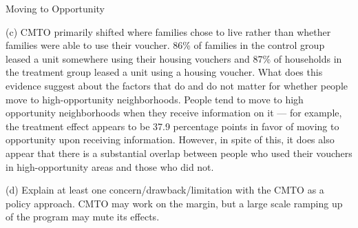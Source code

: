 \documentclass[10pt]{extarticle}
\begin{document}
\begin{problem}{Moving to Opportunity}
\begin{problem}{(c)}
      CMTO primarily shifted where families chose to live rather than whether families were able to use their voucher. 86\% of families in the control group leased a unit somewhere using their housing vouchers and 87\% of households in the treatment group leased a unit using a housing voucher. What does this evidence suggest about the factors that do and do not matter for whether people move to high-opportunity neighborhoods.
      \tcblower
      People tend to move to high opportunity neighborhoods when they receive information on it --- for example, the treatment effect appears to be 37.9 percentage points in favor of moving to opportunity upon receiving information. However, in spite of this, it does also appear that there is a substantial overlap between people who used their vouchers in high-opportunity areas and those who did not.
    \end{problem}
    \begin{problem}{(d)}
      Explain at least one concern/drawback/limitation with the CMTO as a policy approach.
      \tcblower
      CMTO may work on the margin, but a large scale ramping up of the program may mute its effects.
    \end{problem}
  \end{problem}
\end{document}
